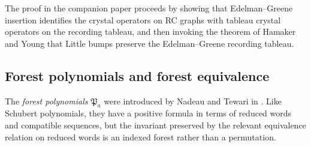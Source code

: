 \documentclass[pdflatex,sn-mathphys-num]{sn-jnl}
\numberwithin{equation}{subsection}
\newcommand{\forest}{\mathfrak{P}}
\theoremstyle{thmstyleone}
\theoremstyle{thmstylethree}
\theoremstyle{thmstyletwo}
\begin{document}
The proof in the companion paper proceeds by showing that Edelman--Greene insertion identifies the crystal operators on RC graphs with tableau crystal operators on the recording tableau, and then invoking the theorem of Hamaker and Young \cite[Theorem~4.4]{hamaker2014relating} that Little bumps preserve the Edelman--Greene recording tableau.

\subsection{Forest polynomials and forest equivalence}\label{section:forestbackground}

The \emph{forest polynomials} $\forest_a$ were introduced by Nadeau and Tewari in \cite{nadeau2024forest}. Like Schubert polynomials, they have a positive formula in terms of reduced words and compatible sequences, but the invariant preserved by the relevant equivalence relation on reduced words is an indexed forest rather than a permutation.
\end{document}
